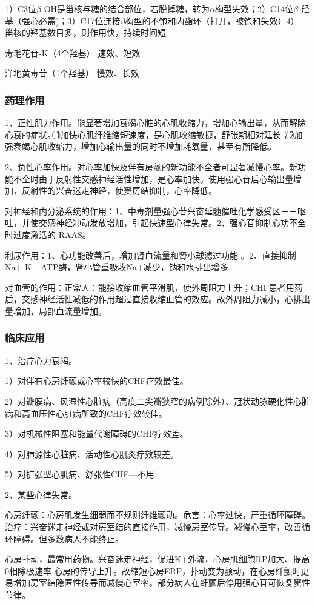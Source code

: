 \documentclass[UTF8]{ctexbook}
\begin{document}
1）C3位\(\beta\)-OH是甾核与糖的结合部位，若脱掉糖，转为\(\alpha\)构型失效；2）C14位\(\beta\)-羟基（强心必需)；3）C17位连接\(\beta\)构型的不饱和内酯环（打开，被饱和失效）4） 甾核的羟基数目多，则作用快，持续时间短

毒毛花苷-K（4个羟基） 速效、短效

洋地黄毒苷（1个羟基） 慢效、长效
\subsubsection{药理作用}
1、正性肌力作用。能显著增加衰竭心脏的心肌收缩力，增加心输出量，从而解除心衰的症状。\textcircled{1}加快心肌纤维缩短速度，是心肌收缩敏捷，舒张期相对延长；\textcircled{2}加强衰竭心肌收缩力，增加心输出量的同时不增加耗氧量，甚至有所降低。

2、负性心率作用。对心率加快及伴有房颤的新功能不全者可显著减慢心率。新功能不全时由于反射性交感神经活性增加，是心率加快。使用强心苷后心输出量增加，反射性的兴奋迷走神经，使窦房结抑制，心率降低。

对神经和内分泌系统的作用：1、中毒剂量强心苷兴奋延髓催吐化学感受区－－呕吐，并使交感神经冲动发放增加，引起快速型心律失常。2、强心苷抑制心功不全时过度激活的 RAAS。

利尿作用：1、心功能改善后，增加肾血流量和肾小球滤过功能 。2、直接抑制Na+-K+-ATP酶，肾小管重吸收Na+减少，钠和水排出增多

对血管的作用：正常人：能接收缩血管平滑肌，使外周阻力上升；CHF患者用药后，交感神经活性减低的作用超过直接收缩血管的效应。故外周阻力减小，心排出量增加，局部血流量增加。
\subsubsection{临床应用}
1、治疗心力衰竭。

1）对伴有心房纤颤或心率较快的CHF疗效最佳。

2）对瓣膜病、风湿性心脏病（高度二尖瓣狭窄的病例除外）、冠状动脉硬化性心脏病和高血压性心脏病所致的CHF疗效较佳。

3）对机械性阻塞和能量代谢障碍的CHF疗效差。

4）对肺源性心脏病、活动性心肌炎疗效较差。

5）对扩张型心肌病、舒张性CHF---不用

2、某些心律失常。

心房纤颤：心房肌发生细弱而不规则纤维颤动。危害：心率过快，严重循环障碍。治疗：兴奋迷走神经或对房室结的直接作用，减慢房室传导。减慢心室率，改善循环障碍。但多数病人不能终止。

心房扑动，最常用药物。兴奋迷走神经，促进K+外流，心房肌细胞RP加大、提高0相除极速率,心房的传导上升。故缩短心房ERP，扑动变为颤动，在心房纤颤时更易增加房室结隐匿性传导而减慢心室率。部分病人在纤颤后停用强心苷可恢复窦性节律。
\end{document}
